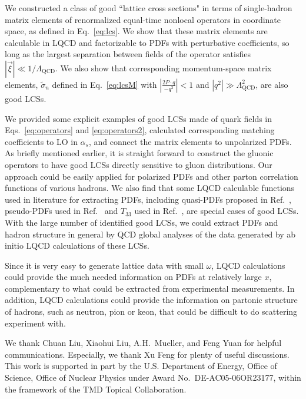 \documentclass[twocolumn,aps,prl,superscriptaddress,nofootinbib,showpacs]{revtex4-1}
\newcommand{\sect}[1]{\noindent{\it \textbf{#1} ---}}
\begin{document}
\sect{Summary}
We constructed a class of good ``lattice cross sections" in terms of single-hadron matrix elements of renormalized equal-time nonlocal operators in coordinate space, as defined in Eq.~\eqref{eq:lcs}.  We show that these matrix elements are calculable in LQCD and factorizable to PDFs with perturbative coefficients, so long as the largest separation between fields of the operator satisfies $|\vec{\xi}|\ll1/\Lambda_{\text{QCD}}$.  We also show that corresponding momentum-space matrix elements, $\widetilde{\sigma}_n$ defined in Eq.~\eqref{eq:lcsM} with $|\frac{2P\cdot q}{-q^2}|<1$ and $|q^2|\gg\Lambda_{\text{QCD}}^2$, are also good LCSs.

We provided some explicit examples of good LCSs made of quark fields in Eqs.~\eqref{eq:operators} and \eqref{eq:operators2}, calculated corresponding matching coefficients to LO in $\alpha_s$, and connect the matrix elements to unpolarized PDFs. As briefly mentioned earlier, it is straight forward to construct the gluonic operators to have good LCSs directly sensitive to gluon distributions.  Our approach could be easily applied for polarized PDFs and other parton correlation functions of various hadrons.  We also find that some LQCD calculable functions used in literature for extracting PDFs, including quasi-PDFs proposed in Ref.~\cite{Ji:2013dva}, pseudo-PDFs used in Ref.~ \cite{Orginos:2017kos} and $T_{33}$ used in Ref.~\cite{Chambers:2017dov}, are special cases of good LCSs.  With the large number of identified good LCSs, we could extract PDFs and hadron structure in general by QCD global analyses of the data generated by ab initio LQCD calculations of these LCSs.

Since it is very easy to generate lattice data with small $\omega$, LQCD calculations could provide the much needed information on PDFs at relatively large $x$, complementary to what could be extracted from experimental measurements. In addition, LQCD calculations could provide the information on partonic structure of hadrons, such as neutron, pion or keon, that could be difficult to do scattering experiment with.

\sect{Acknowledgments}
We thank Chuan Liu, Xiaohui Liu, A.H.~Mueller, and Feng Yuan for helpful communications. Especially, we thank Xu Feng for plenty of useful discussions. This work is supported in part by the U.S. Department of Energy, Office of Science, Office of Nuclear Physics under Award No.~DE-AC05-06OR23177, within the framework of the TMD Topical Collaboration.


%
%
%
\end{document}
